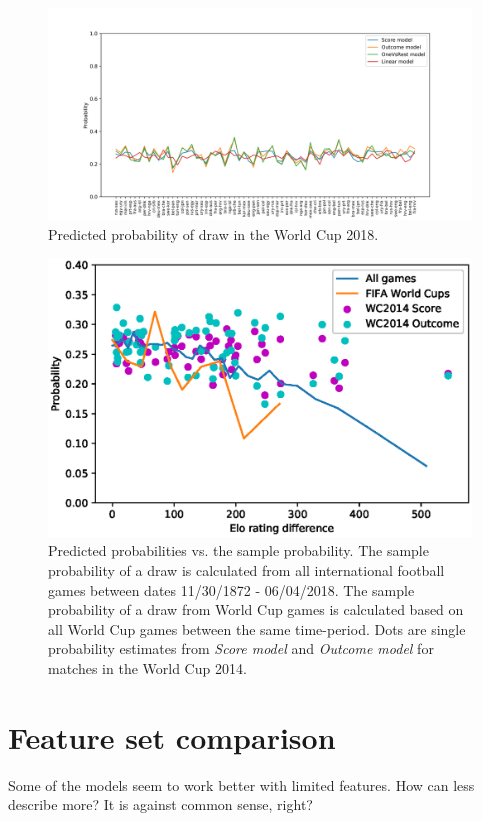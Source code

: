 \begin{figure}[H]
    \centering
    \includegraphics[width=1\textwidth]{img/match_level_2018_model_probability_draw_prob.png}
    \caption{Predicted probability of draw in the World Cup 2018.}
    \label{fig:draw_probability}
\end{figure}

\begin{figure}[H]
    \centering
    \includegraphics[width=1\textwidth]{img/draw_true_probability_wc.eps}
    \caption{Predicted probabilities vs. the sample probability. The sample probability of a draw is calculated from all international football games between dates 11/30/1872 - 06/04/2018. The sample probability of a draw from World Cup games is calculated based on all World Cup games between the same time-period. Dots are single probability estimates from \textit{Score model} and \textit{Outcome model} for matches in the World Cup 2014.}
    \label{fig:draw_prob_dist}
\end{figure}

\section{Feature set comparison}
Some of the models seem to work better with limited features. How can less describe more? It is against common sense, right?

